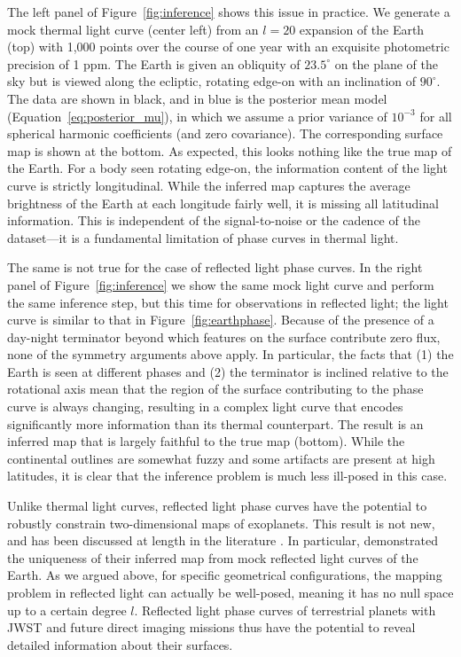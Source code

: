 \documentclass[modern]{aastex62}
\begin{document}
The left panel of Figure~\ref{fig:inference} shows this issue in practice.
We generate a mock thermal light curve (center left) from an $l = 20$
expansion of the Earth (top) with 1,000 points over the course of one year
with an exquisite photometric precision of 1 ppm. The Earth is given
an obliquity of $23.5^\circ$ on the plane of the sky but is viewed
along the ecliptic, rotating edge-on with an inclination of $90^\circ$.
The data are shown in black, and in blue is the posterior mean model
(Equation~\ref{eq:posterior_mu}),
in which we assume a prior variance of $10^{-3}$ for all spherical
harmonic coefficients (and zero covariance). The corresponding surface
map is shown at the bottom. As expected, this looks nothing like the
true map of the Earth. For a body seen rotating edge-on, the information
content of the light curve is strictly longitudinal. While the
inferred map captures the average brightness of the Earth at each
longitude fairly well, it is missing all latitudinal information.
This is independent of the signal-to-noise or the cadence of the
dataset---it is a fundamental limitation of phase curves in thermal light.

The same is not true for the case of reflected light phase curves. In
the right panel of Figure~\ref{fig:inference} we show the same
mock light curve and perform the same inference step,
but this time for observations in reflected light; the light curve
is similar to that in Figure~\ref{fig:earthphase}. Because of the
presence of a day-night terminator beyond which features on the surface
contribute zero flux, none of the symmetry arguments above apply. In
particular, the facts that (1) the Earth is seen at different phases and
(2) the terminator is inclined relative to the rotational axis mean
that the region of the surface contributing to the phase curve is
always changing, resulting in a complex light curve that encodes
significantly more information than its thermal counterpart.
%
The result is an inferred map that is largely faithful to the
true map (bottom). While the continental outlines are somewhat fuzzy and some
artifacts are present at high latitudes, it is clear that the
inference problem is much less ill-posed in this case.

Unlike thermal light curves, reflected light phase curves have the
potential to robustly constrain two-dimensional maps of exoplanets.
This result is
not new, and has been discussed at length in the literature
\citep[e.g.,][]{Fujii2012,Berdyugina2017,Luger2019b,Aizawa2020,Kawahara2020}.
In particular, \citet{Kawahara2010} demonstrated the uniqueness of their
inferred map from mock reflected light curves of the Earth. As we argued
above, for specific geometrical configurations, the mapping problem
in reflected light can actually be well-posed, meaning it has no
null space up to a certain degree $l$. Reflected light phase curves of
terrestrial planets with JWST and future direct imaging missions thus
have the potential to reveal detailed information about their surfaces.
\end{document}
